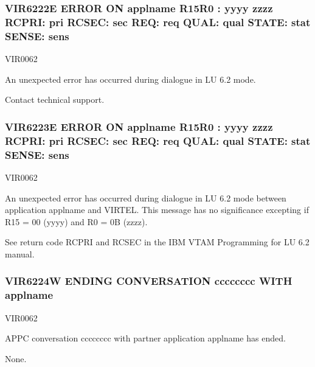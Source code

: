\documentclass[letterpaper,10pt,english]{sphinxmanual}
\begin{document}
\subsubsection{VIR6222E ERROR ON applname \sphinxhyphen{} R15\sphinxhyphen{}R0 : yyyy zzzz RCPRI: pri RCSEC: sec REQ: req QUAL: qual STATE: stat SENSE: sens}
\label{\detokenize{messages:vir6222e-error-on-applname-r15-r0-yyyy-zzzz-rcpri-pri-rcsec-sec-req-req-qual-qual-state-stat-sense-sens}}\begin{description}
\sphinxAtStartPar
VIR0062

\sphinxAtStartPar
An unexpected error has occurred during dialogue in LU 6.2 mode.

\sphinxAtStartPar
Contact technical support.

\end{description}


\subsubsection{VIR6223E ERROR ON applname \sphinxhyphen{} R15\sphinxhyphen{}R0 : yyyy zzzz RCPRI: pri RCSEC: sec REQ: req QUAL: qual STATE: stat SENSE: sens}
\label{\detokenize{messages:vir6223e-error-on-applname-r15-r0-yyyy-zzzz-rcpri-pri-rcsec-sec-req-req-qual-qual-state-stat-sense-sens}}\begin{description}
\sphinxAtStartPar
VIR0062

\sphinxAtStartPar
An unexpected error has occurred during dialogue in LU 6.2 mode between application applname and VIRTEL. This message has no significance excepting if R15 = 00 (yyyy) and R0 = 0B (zzzz).

\sphinxAtStartPar
See return code RCPRI and RCSEC in the IBM VTAM Programming for LU 6.2 manual.

\end{description}


\subsubsection{VIR6224W ENDING CONVERSATION cccccccc WITH applname}
\label{\detokenize{messages:vir6224w-ending-conversation-cccccccc-with-applname}}\begin{description}
\sphinxAtStartPar
VIR0062

\sphinxAtStartPar
APPC conversation cccccccc with partner application applname has ended.

\sphinxAtStartPar
None.

\end{description}
\end{document}
